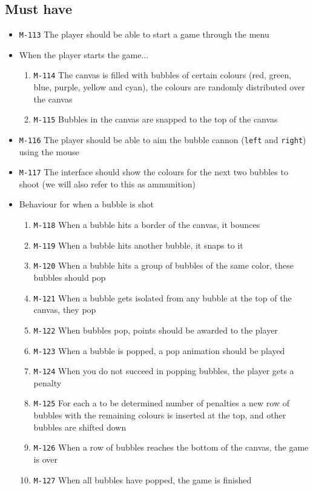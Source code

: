 \documentclass[a4paper]{article}
\begin{document}
\subsection{Must have}

\begin{itemize}
  \item \texttt{M-113} The player should be able to start a game through the menu

  \item When the player starts the game...
  \begin{enumerate}
    \item \texttt{M-114} The canvas is filled with bubbles of certain colours (red, green, blue, purple, yellow and cyan), the colours are randomly distributed over the canvas
    \item \texttt{M-115} Bubbles in the canvas are snapped to the top of the canvas
  \end{enumerate}
  
  \item \texttt{M-116} The player should be able to aim the bubble cannon (\texttt{left} and \texttt{right}) using the mouse
  \item \texttt{M-117} The interface should show the colours for the next two bubbles to shoot (we will also refer to this as ammunition)


  \item Behaviour for when a bubble is shot
  \begin{enumerate}
    \item \texttt{M-118} When a bubble hits a border of the canvas, it bounces
    \item \texttt{M-119} When a bubble hits another bubble, it snaps to it
    \item \texttt{M-120} When a bubble hits a group of bubbles of the same color, these bubbles should pop
    \item \texttt{M-121} When a bubble gets isolated from any bubble at the top of the canvas, they pop
    \item \texttt{M-122} When bubbles pop, points should be awarded to the player
    \item \texttt{M-123} When a bubble is popped, a pop animation should be played
    \item \texttt{M-124} When you do not succeed in popping bubbles, the player gets a penalty
    \item \texttt{M-125} For each a to be determined number of penalties a new row of bubbles with the remaining colours is inserted at the top, and other bubbles are shifted down
    \item \texttt{M-126} When a row of bubbles reaches the bottom of the canvas, the game is over
    \item \texttt{M-127} When all bubbles have popped, the game is finished
  \end{enumerate}
  

\end{itemize}
\end{document}
